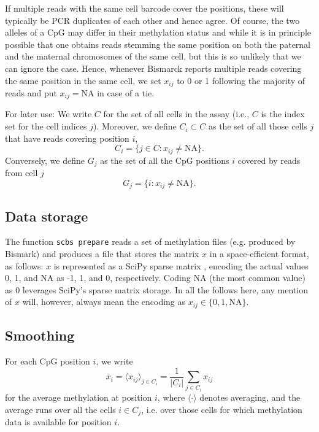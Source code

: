 \documentclass[twocolumn,10pt]{article}
\newcommand{\todo}[1]{[\textcolor{orange}{#1}]}
\begin{document}
If multiple reads with the same cell barcode cover the positions, these will typically be PCR duplicates of each other and hence agree. Of course, the two alleles of a CpG may differ in their methylation status and while it is in principle possible that one obtains reads stemming the same position on both the paternal and the maternal chromosomes of the same cell, but this is so unlikely that we can ignore the case. Hence, whenever Bismarck reports multiple reads covering the same position in the same cell, we set $x_{ij}$ to 0 or 1 following the majority of reads and put $x_{ij}=\text{NA}$ in case of a tie. 

For later use: We write $C$ for the set of all cells in the assay (i.e., $C$ is the index set for the cell indices $j$). Moreover,
we define $C_i\subset C$ as the set of all those cells $j$ that have reads covering position $i$,
$$ C_i=\{j\in C: x_{ij}\neq\text{NA}\}.$$
Conversely, we define $G_j$ as the set of all the CpG positions $i$ covered by reads from cell $j$ 
$$ G_j=\{i: x_{ij}\neq\text{NA}\}.$$

\subsection{Data storage}

The function \texttt{scbs prepare} reads a set of methylation files (e.g. produced by Bismark) and produces a file that stores the matrix $x$ in a space-efficient format, as follows: $x$ is represented as a SciPy sparse matrix \citep{SciPy}, encoding the actual values 0, 1, and NA as -1, 1, and 0, respectively. Coding NA (the most common value) as 0 leverages SciPy's sparse matrix storage. In all the follows here, any mention of $x$ will, however, always mean the encoding as $x_{ij}\in\{0,1,\text{NA}\}$.

\subsection{Smoothing}

For each CpG position $i$, we write 
$$\overline{x}_i=\langle x_{ij} \rangle_{j\in C_i} = \frac{1}{|C_i|}\sum_{j\in C_i} x_{ij}$$ 
for the average methylation at position $i$, where $\langle\cdot\rangle$ denotes averaging, and the average runs over all the cells $i\in C_j$, i.e. over those cells for which methylation data is available for position $i$.

\end{document}
